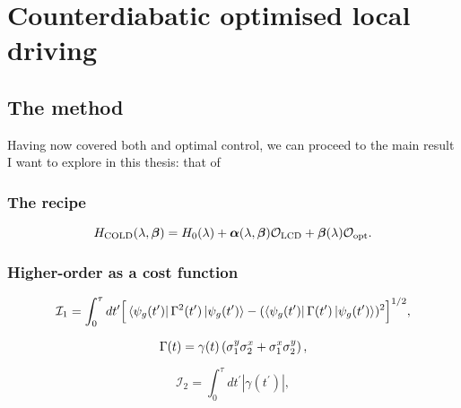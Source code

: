 \part{Counterdiabatic optimised local driving}

\chapter{The  method}\label{chap:4_COLD}

Having now covered both  and optimal control, we can proceed to the main result I want to explore in this thesis: that of 

\section{The recipe}

\begin{equation}\label{eq:expandedH}
H_{\rm COLD}(\lambda,\boldsymbol{\beta}) = H_0(\lambda) + {\boldsymbol \alpha}(\lambda,\boldsymbol{\beta}) \mathcal{O}_{\rm LCD} + \boldsymbol{\beta}(\lambda) \mathcal{O}_{\rm opt}.
\end{equation}

\section{Higher-order  as a cost function}

\begin{equation}\label{eq:AGP_integral_1}
\mathcal{I}_1 = \int_0^\tau dt^\prime \Big[\bra{\psi_g(t^\prime)} \Gamma^2(t^\prime) \ket{\psi_g(t^\prime)}  - (\bra{\psi_g(t^\prime)} \Gamma(t^\prime) \ket{\psi_g(t^\prime)})^2\Big]^{1/2},
\end{equation}

\begin{equation}\label{eq:Gamma_def}
\Gamma(t) = \gamma(t) \left( \sigma^y_1 \sigma^x_2 + \sigma^x_1 \sigma^y_2 \right),
\end{equation}

\begin{equation}\label{eq:AGP_integral_2}
\mathcal{I}_2 = \int_0^\tau dt^\prime |\gamma(t^\prime)|,
\end{equation}